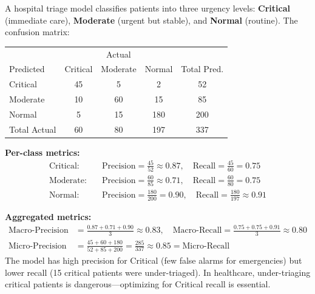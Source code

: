 \begin{example}
    A hospital triage model classifies patients into three urgency levels: \textbf{Critical} (immediate care), \textbf{Moderate} (urgent but stable), and \textbf{Normal} (routine). The confusion matrix:
    \begin{center}
        \begin{tabular}{l|ccc|c}
                         & \multicolumn{3}{c|}{Actual}                                   \\
            Predicted    & Critical                    & Moderate & Normal & Total Pred. \\
            \hline
            Critical     & 45                          & 5        & 2      & 52          \\
            Moderate     & 10                          & 60       & 15     & 85          \\
            Normal       & 5                           & 15       & 180    & 200         \\
            \hline
            Total Actual & 60                          & 80       & 197    & 337
        \end{tabular}
    \end{center}

    \textbf{Per-class metrics:}
    \begin{align*}
        \text{Critical:} \quad & \text{Precision} = \tfrac{45}{52} \approx 0.87, \quad \text{Recall} = \tfrac{45}{60} = 0.75     \\
        \text{Moderate:} \quad & \text{Precision} = \tfrac{60}{85} \approx 0.71, \quad \text{Recall} = \tfrac{60}{80} = 0.75     \\
        \text{Normal:} \quad   & \text{Precision} = \tfrac{180}{200} = 0.90, \quad \text{Recall} = \tfrac{180}{197} \approx 0.91
    \end{align*}

    \textbf{Aggregated metrics:}
    \begin{align*}
        \text{Macro-Precision} & = \tfrac{0.87 + 0.71 + 0.90}{3} \approx 0.83, \quad
        \text{Macro-Recall} = \tfrac{0.75 + 0.75 + 0.91}{3} \approx 0.80                                                      \\[4pt]
        \text{Micro-Precision} & = \tfrac{45 + 60 + 180}{52 + 85 + 200} = \tfrac{285}{337} \approx 0.85 = \text{Micro-Recall}
    \end{align*}
    The model has high precision for Critical (few false alarms for emergencies) but lower recall (15 critical patients were under-triaged). In healthcare, under-triaging critical patients is dangerous---optimizing for Critical recall is essential.
\end{example}

